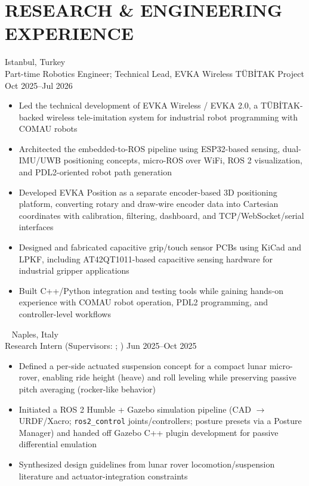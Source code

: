 \section*{RESEARCH \& ENGINEERING EXPERIENCE}

\textbf{} \hfill Istanbul, Turkey\\
Part-time Robotics Engineer; Technical Lead, EVKA Wireless TÜBİTAK Project \hfill Oct 2025--Jul 2026
\begin{itemize}
  \item Led the technical development of EVKA Wireless / EVKA 2.0, a TÜBİTAK-backed wireless tele-imitation system for industrial robot programming with COMAU robots
  \item Architected the embedded-to-ROS pipeline using ESP32-based sensing, dual-IMU/UWB positioning concepts, micro-ROS over WiFi, ROS 2 visualization, and PDL2-oriented robot path generation
  \item Developed EVKA Position as a separate encoder-based 3D positioning platform, converting rotary and draw-wire encoder data into Cartesian coordinates with calibration, filtering, dashboard, and TCP/WebSocket/serial interfaces
  \item Designed and fabricated capacitive grip/touch sensor PCBs using KiCad and LPKF, including AT42QT1011-based capacitive sensing hardware for industrial gripper applications
  \item Built C++/Python integration and testing tools while gaining hands-on experience with COMAU robot operation, PDL2 programming, and controller-level workflows
\end{itemize}
\entrysep

\textbf{} \textbar\  \hfill Naples, Italy\\
Research Intern (Supervisors: ; ) \hfill Jun 2025--Oct 2025
\begin{itemize}
  \item Defined a per-side actuated suspension concept for a compact lunar micro-rover, enabling ride height (heave) and roll leveling while preserving passive pitch averaging (rocker-like behavior)
  \item Initiated a ROS 2 Humble + Gazebo simulation pipeline (CAD $\rightarrow$ URDF/Xacro; \texttt{ros2\_control} joints/controllers; posture presets via a Posture Manager) and handed off Gazebo C++ plugin development for passive differential emulation
  \item Synthesized design guidelines from lunar rover locomotion/suspension literature and actuator-integration constraints
\end{itemize}
\entrysep

